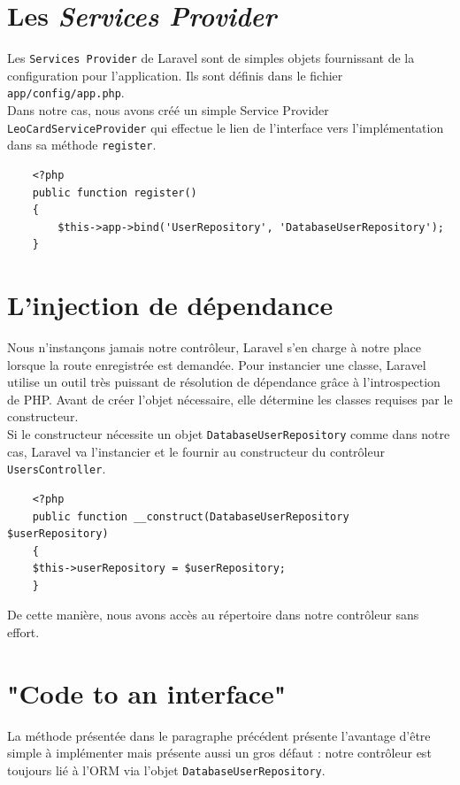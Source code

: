 \section{Les \textit{Services Provider}}
	Les \verb|Services Provider| de Laravel sont de simples objets fournissant de la configuration pour l'application. Ils sont définis dans le fichier \verb|app/config/app.php|.\\

	Dans notre cas, nous avons créé un simple Service Provider \verb|LeoCardServiceProvider| qui effectue le lien de l'interface vers l'implémentation dans sa méthode \verb|register|.
	\begin{verbatim}
	<?php
	public function register()
	{
		$this->app->bind('UserRepository', 'DatabaseUserRepository');
	}
	\end{verbatim}

\section{L'injection de dépendance}
	Nous n'instançons jamais notre contrôleur, Laravel s'en charge à notre place lorsque la route enregistrée est demandée. Pour instancier une classe, Laravel utilise un outil très puissant de résolution de dépendance grâce à l'introspection de PHP. Avant de créer l'objet nécessaire, elle détermine les classes requises par le constructeur.\\

	Si le constructeur nécessite un objet \verb|DatabaseUserRepository| comme dans notre cas, Laravel va l'instancier et le fournir au constructeur du contrôleur \verb|UsersController|.
	\begin{verbatim}
	<?php
	public function __construct(DatabaseUserRepository $userRepository)
	{
	$this->userRepository = $userRepository;
	}
	\end{verbatim}

	De cette manière, nous avons accès au répertoire dans notre contrôleur sans effort.

\section{"Code to an interface"}
	La méthode présentée dans le paragraphe précédent présente l'avantage d'être simple à implémenter mais présente aussi un gros défaut : notre contrôleur est toujours lié à l'ORM via l'objet \verb|DatabaseUserRepository|.\\

